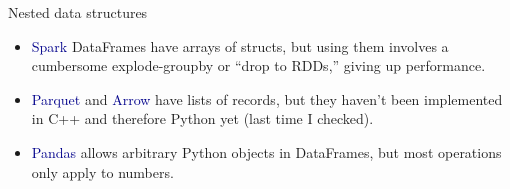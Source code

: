 \documentclass[aspectratio=169]{beamer}
\begin{document}
\begin{frame}{Nested data structures}
\large
\vspace{0.5 cm}
 \hfill {}

\vspace{0.75 cm}
\begin{itemize}\setlength{\itemsep}{0.35 cm}
\item<3-> \textcolor{darkblue}{Spark} DataFrames have arrays of structs, but using them involves a cumbersome explode-groupby or ``drop to RDDs,'' giving up performance.
\item<4-> \textcolor{darkblue}{Parquet} and \textcolor{darkblue}{Arrow} have lists of records, but they haven't been implemented in C++ and therefore Python yet (last time I checked).
\item<5-> \textcolor{darkblue}{Pandas} allows arbitrary Python objects in DataFrames, but most operations only apply to numbers.
\end{itemize}
\end{frame}
\end{document}
